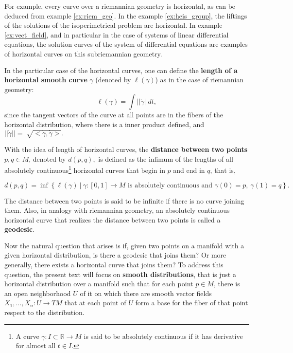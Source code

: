 \documentclass[12pt, letterpaper, reqno]{amsart}
\theoremstyle{definition}
\theoremstyle{plain}
\theoremstyle{remark}
\begin{document}
For example, every curve over a riemannian geometry is horizontal, as can be deduced from example \ref{ex:riem_geo}. In the example \ref{ex:heis_group}, the liftings of the solutions of the isoperimetrical problem are horizontal. In example \ref{ex:vect_field}, and in particular in the case of systems of linear differential equations, the solution curves of the system of differential equations are examples of horizontal curves on this subriemannian geometry.

In the particular case of the horizontal curves, one can define the \textbf{length of a horizontal smooth curve} $ \gamma $ (denoted by $ \ell(\gamma) $) as in the case of riemannian geometry:
$$ \ell(\gamma) = \int ||\dot{\gamma}|| dt, $$ 
since the tangent vectors of the curve at all points are in the fibers of the horizontal distribution, where there is a inner product defined, and $ ||\dot{\gamma}||= \sqrt[]{<\dot{\gamma}, \dot{\gamma}>}.  $   

With the idea of length of horizontal curves, the \textbf{distance between two points} $ p,q\in M $, denoted by $ d(p,q), $   is defined as the infimum of the lengths of all absolutely continuous\footnote{A curve $ \gamma:I\subset \mathbb{R}  \rightarrow {M} $ is said to be absolutely continuous if it has derivative for almost all $ t\in I. $ } horizontal curves that begin in $ p $ and end in $ q $, that is, 

$$ d(p,q) = \operatorname{inf} \left\{ \ell(\gamma) \ |\ \gamma:[0,1] \rightarrow {M} \text{ is absolutely continuous and }\gamma(0)=p, \ \gamma(1)=q \right\}. $$ 

The distance between two points is said to be infinite if there is no curve joining them. Also, in analogy with riemannian geometry, an absolutely continuous horizontal curve that realizes the distance between two points is called a \textbf{geodesic}. 

Now the natural question that arises is if, given two points on a manifold with a given horizontal distribution, is there a geodesic that joins them? Or more generally, there exists a horizontal curve that joins them? To address this question, the present text will focus on \textbf{smooth distributions}, that is just a horizontal distribution over a manifold such that for each point $ p\in M $, there is an open neighborhood $ U $ of it on which there are smooth vector fields $ X_1,\dots,X_n: U \rightarrow {TM} $ that at each point of $ U $ form a base for the fiber of that point respect to the distribution.
\end{document}
